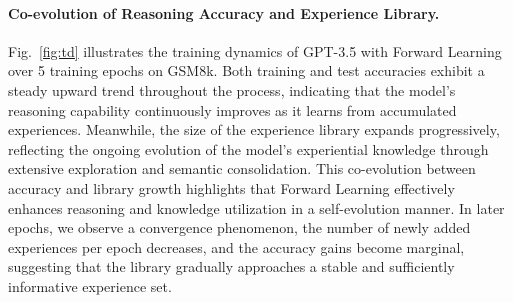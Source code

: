 \documentclass{article}
\newcommand{\method}{Forward Learning}
\begin{document}
\paragraph{Co-evolution of Reasoning Accuracy and Experience Library.}%
Fig.~\ref{fig:td} illustrates the training dynamics of GPT-3.5 with \method{} over 5 training epochs on GSM8k. 
Both training and test accuracies exhibit a steady upward trend throughout the process, indicating that the model’s reasoning capability continuously improves as it learns from accumulated experiences.
Meanwhile, the size of the experience library expands progressively, reflecting the ongoing evolution of the model’s experiential knowledge through extensive exploration and semantic consolidation.
This co-evolution between accuracy and library growth highlights that \method{} effectively enhances reasoning and knowledge utilization in a self-evolution manner.
In later epochs, we observe a convergence phenomenon, the number of newly added experiences per epoch decreases, and the accuracy gains become marginal, suggesting that the library gradually approaches a stable and sufficiently informative experience set.
\end{document}
